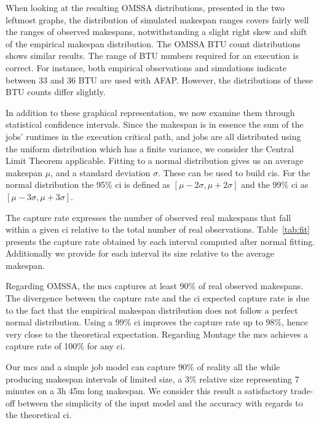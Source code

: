 \documentclass[10pt,conference,compsocconf]{IEEEtran}
\begin{document}
When looking at the resulting OMSSA distributions, presented in the two leftmost
graphs,  the distribution  of simulated  makespan ranges  covers fairly  well the
ranges of  observed makespans, notwithstanding a  slight right skew and  shift of
the empirical  makespan distribution.  The  OMSSA BTU count  distributions shows
similar results.  The range of BTU  numbers required for an execution is correct.
For instance,  both empirical  observations  and simulations  indicate
between  33 and  36 BTU  are used with AFAP. However, the  distributions of  these BTU  counts
differ slightly.


In addition to these graphical representation,  we  now examine  them  through
statistical confidence intervals.   Since the makespan is in essence  the sum of 
the jobs' runtimes  in the  execution critical path,  and jobs  are all
distributed  using the  uniform distribution  which  has a  finite variance,  we
consider the Central Limit Theorem applicable.  Fitting to a normal distribution 
gives us an average makespan $\mu{}$, and a standard deviation $\sigma{}$. These
can be used to  build \acp{ci}. For the normal distribution  the 95\% \ac{ci} is
defined  as   $[\mu{}-2\sigma{},\mu{}+2\sigma{}]$  and   the  99\%   \ac{ci}  as
$[\mu{}-3\sigma{},\mu{}+3\sigma{}]$.

The capture rate expresses the number of observed real makespans that fall
within a given \ac{ci} relative to the total number of real observations.
Table~\ref{tab:fit} presents the capture rate obtained by each interval computed
after normal fitting.  Additionally we provide for each interval its size
relative to the average makespan.

Regarding OMSSA, the  \ac{mcs} captures at least 90\% of real observed  makespans. The divergence
between the  capture rate and  the \ac{ci} expected capture  rate is due  to the
fact that the  empirical makespan distribution does not follow  a perfect normal
distribution. Using  a 99\% \ac{ci}  improves the capture  rate up to  98\%,
hence very close  to the theoretical expectation. Regarding Montage  the
\ac{mcs} achieves a capture rate of 100\% for any \ac{ci}.


Our \ac{mcs} and a simple job model can capture 90\% of reality all the while
producing makespan intervals of limited size, a 3\% relative size representing 7
minutes on a 3h 45m long makespan. We consider this result a satisfactory
trade-off between the simplicity of the input model and the accuracy with
regards to the theoretical \ac{ci}.
\end{document}
